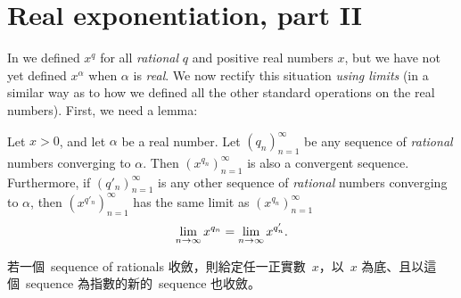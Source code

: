 \section{Real exponentiation, part II} \label{sec 6.7}

In  we defined \(x^q\) for all \emph{rational} \(q\) and positive real numbers \(x\), but we have not yet defined \(x^{\alpha}\) when \(\alpha\) is \emph{real}.
We now rectify this situation \emph{using limits} (in a similar way as to how we defined all the other standard operations on the real numbers).
First, we need a lemma:
\begin{lemma}  \label{lem 6.7.1}
Let \(x > 0\), and let \(\alpha\) be a real number.
Let \((q_n)_{n = 1}^{\infty}\) be any sequence of \emph{rational} numbers converging to \(\alpha\).
Then \((x^{q_n})_{n = 1}^{\infty}\) is also a convergent sequence.
Furthermore, if \((q'_n)_{n = 1}^{\infty}\) is any other sequence of \emph{rational} numbers converging to \(\alpha\), then \((x^{q'_n})_{n = 1}^{\infty}\) has the same limit as \((x^{q_n})_{n = 1}^{\infty}\)
\[
    \lim_{n \to \infty} x^{q_n} = \lim_{n \to \infty} x^{q'_n}.
\]
\end{lemma}

\begin{note}
若一個\ sequence of rationals 收斂，則給定任一正實數\ \(x\)，以\ \(x\) 為底、且以這個\ sequence 為指數的新的\ sequence 也收斂。
\end{note}


